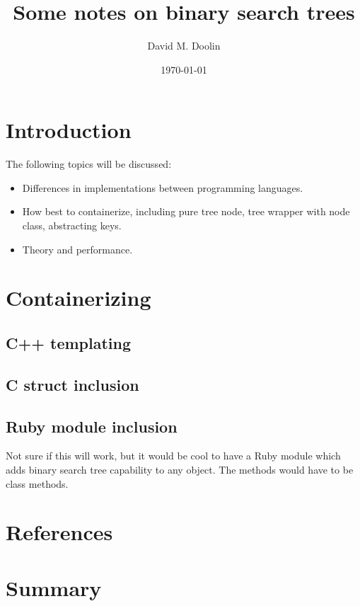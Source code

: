 \documentclass{article}
\title{Some notes on binary search trees}
\date{\today}
\author{David M. Doolin}
\begin{document}
\maketitle




\section{Introduction}


The following topics will be discussed:

\begin{itemize}

\item Differences in implementations between programming languages.
\item How best to containerize, including pure tree node, tree wrapper with
node class, abstracting keys.
\item Theory and performance.

\end{itemize}



\section{Containerizing}

\subsection{C++ templating}

\subsection{C struct inclusion}

\subsection{Ruby module inclusion}

Not sure if this will work, but it would be cool to have a Ruby module which
adds binary search tree capability to any object. The methods would have to be
class methods.

\section{References}


\section{Summary}

\appendix
\end{document}
